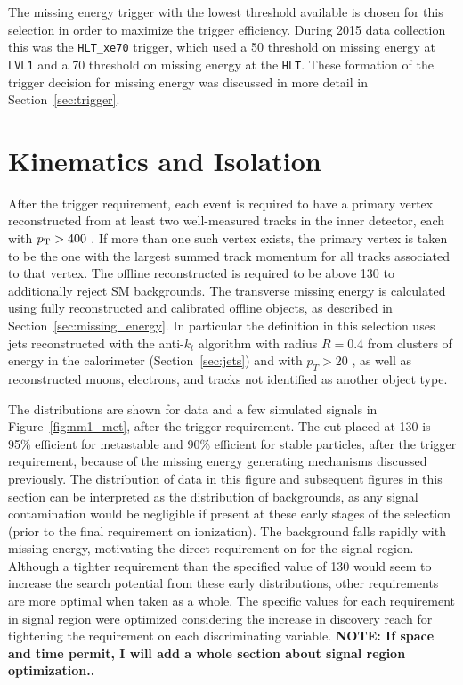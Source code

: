 The missing energy trigger with the lowest threshold available is chosen for this selection in order to maximize the trigger efficiency. 
During 2015 data collection this was the \texttt{HLT\_xe70} trigger, which used a 50 \GeV threshold on missing energy at \texttt{LVL1} and a 70 \GeV threshold on missing energy at the \texttt{HLT}.
These formation of the trigger decision for missing energy was discussed in more detail in Section~\ref{sec:trigger}.



\section{Kinematics and Isolation}
\label{sec:track_requirements}

After the trigger requirement, each event is required to have a primary vertex reconstructed from at least two well-measured tracks in the inner detector, each with $p_{\mathrm{T}} > 400$ \MeV. 
If more than one such vertex exists, the primary vertex is taken to be the one with the largest summed track momentum for all tracks associated to that vertex. 
The offline reconstructed \met is required to be above 130 \GeV to additionally reject \ac{SM} backgrounds.
The transverse missing energy is calculated using fully reconstructed and calibrated offline objects, as described in Section~\ref{sec:missing_energy}. 
In particular the \met definition in this selection uses jets reconstructed with the anti-$k_t$ algorithm with radius $R = 0.4$ from clusters of energy in the calorimeter (Section~\ref{sec:jets}) and with $p_T > 20$ \GeV, as well as reconstructed muons, electrons, and tracks not identified as another object type.

The \met distributions are shown for data and a few simulated signals in Figure~\ref{fig:nm1_met}, after the trigger requirement.
The cut placed at 130 \GeV is 95\% efficient for metastable and 90\% efficient for stable particles, after the trigger requirement, because of the missing energy generating mechanisms discussed previously.
The distribution of data in this figure and subsequent figures in this section can be interpreted as the distribution of backgrounds, as any signal contamination would be negligible if present at these early stages of the selection (prior to the final requirement on ionization). 
The background falls rapidly with missing energy, motivating the direct requirement on \met for the signal region.
Although a tighter requirement than the specified value of 130 \GeV would seem to increase the search potential from these early distributions, other requirements are more optimal when taken as a whole.
The specific values for each requirement in signal region were optimized considering the increase in discovery reach for tightening the requirement on each discriminating variable. 
\textbf{NOTE: If space and time permit, I will add a whole section about signal region optimization..}

